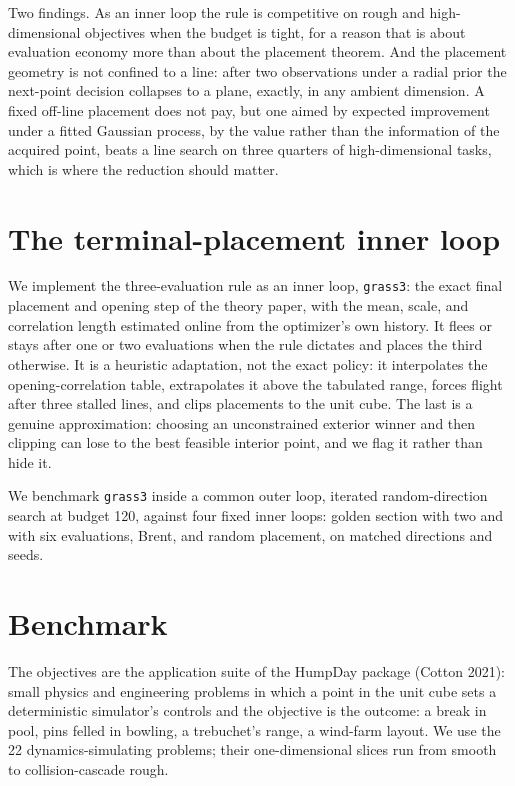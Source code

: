 \documentclass[11pt]{article}
\theoremstyle{itheads}
\begin{document}
Two findings. As an inner loop the rule is competitive on rough and
high-dimensional objectives when the budget is tight, for a reason that
is about evaluation economy more than about the placement theorem. And
the placement geometry is not confined to a line: after two
observations under a radial prior the next-point decision collapses to
a plane, exactly, in any ambient dimension. A fixed off-line placement
does not pay, but one aimed by expected improvement under a fitted
Gaussian process, by the value rather than the information of the
acquired point, beats a line search on three quarters of high-dimensional
tasks, which is where the reduction should matter.

\section{The terminal-placement inner loop}

We implement the three-evaluation rule as an inner loop, \texttt{grass3}:
the exact final placement and opening step of the theory paper, with the
mean, scale, and correlation length estimated online from the
optimizer's own history. It flees or stays after one or two evaluations
when the rule dictates and places the third otherwise. It is a heuristic
adaptation, not the exact policy: it interpolates the opening-correlation
table, extrapolates it above the tabulated range, forces flight after
three stalled lines, and clips placements to the unit cube. The last is
a genuine approximation: choosing an unconstrained exterior winner and
then clipping can lose to the best feasible interior point, and we
flag it rather than hide it.

We benchmark \texttt{grass3} inside a common outer loop, iterated
random-direction search at budget 120, against four fixed inner loops:
golden section with two and with six evaluations, Brent, and random
placement, on matched directions and seeds.

\section{Benchmark}

The objectives are the application suite of the HumpDay package (Cotton
2021): small physics and engineering problems in which a point in the
unit cube sets a deterministic simulator's controls and the objective is
the outcome: a break in pool, pins felled in bowling, a trebuchet's
range, a wind-farm layout. We use the 22 dynamics-simulating problems;
their one-dimensional slices run from smooth to collision-cascade rough.
\end{document}
